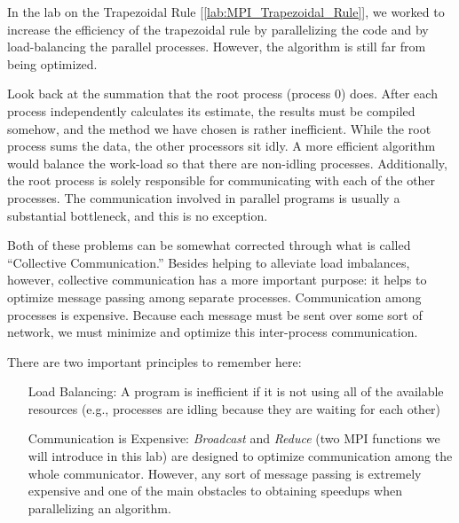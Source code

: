 \label{lab:MPI_Collective_Communication}

In the lab on the Trapezoidal Rule [\ref{lab:MPI_Trapezoidal_Rule}], we worked to increase the efficiency of the trapezoidal rule by parallelizing the code and by load-balancing the parallel processes. However, the algorithm is still far from being optimized.

Look back at the summation that the root process (process 0) does. After each process independently calculates its estimate, the results must be compiled somehow, and the method we have chosen is rather inefficient. While the root process sums the data, the other processors sit idly. A more efficient algorithm would balance the work-load so that there are non-idling processes. Additionally, the root process is solely responsible for communicating with each of the other processes. The communication involved in parallel programs is usually a substantial bottleneck, and this is no exception. 

Both of these problems can be somewhat corrected through what is called ``Collective Communication.'' Besides helping to alleviate load imbalances, however, collective communication has a more important purpose: it helps to optimize message passing among separate processes. Communication among processes is expensive. Because each message must be sent over some sort of network, we must minimize and optimize this inter-process communication.

There are two important principles to remember here:
\begin{enumerate}
\item[Load Balancing:]
A program is inefficient if it is not using all of the available resources (e.g., processes are idling because they are waiting for each other)
\item[Communication is Expensive:]
\emph{Broadcast} and \emph{Reduce} (two MPI functions we will introduce in this lab) are designed to optimize communication among the whole communicator. However, any sort of message passing is extremely expensive and one of the main obstacles to obtaining speedups when parallelizing an algorithm.
\end{enumerate}


